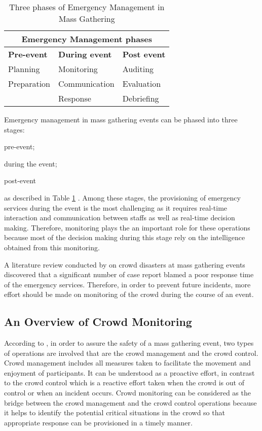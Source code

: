 \begin{table}[!htbp]
	\caption{Three phases of Emergency Management in Mass Gathering}
	\label{table:phaseOfEm}
	\centering
	\begin{tabular}{|p{3cm}|p{3cm}|p{3cm}|}
		\hline
		\multicolumn{3}{|c|}{\textbf{Emergency Management phases}} \\ \hline \hline
		\textbf{Pre-event} & \textbf{During event} & \textbf{Post event} \\	\hline
		Planning & Monitoring  & Auditing  \\
		Preparation & Communication & Evaluation \\
		& Response & Debriefing \\
		\hline
	\end{tabular}
\end{table}

Emergency management in mass gathering events can be phased into three stages: 
\begin{inparaenum}[i)]
	\item pre-event;
	\item during the event;
	\item post-event
\end{inparaenum} as described in Table \ref{table:phaseOfEm} \citep{DelirHaghighi2013}. Among these stages, the provisioning of emergency services during the event is the most challenging as it requires real-time interaction and communication between staffs as well as real-time decision making. Therefore, monitoring plays the an important role for these operations because most of the decision making during this stage rely on the intelligence obtained from this monitoring. 

A literature review conducted by \citet{Soomaroo2012} on crowd disasters at mass gathering events discovered that a significant number of case report blamed a poor response time of the emergency services. Therefore, in order to prevent future incidents, more effort should be made on monitoring of the crowd during the course of an event. 

\subsection{An Overview of Crowd Monitoring}

According to \citet{Berlonghi1995}, in order to assure the safety of a mass gathering event, two types of operations are involved that are the crowd management and the crowd control. Crowd management includes all measures taken to facilitate the movement and enjoyment of participants. It can be understood as a proactive effort, in contrast to the crowd control which is a reactive effort taken when the crowd is out of control or when an incident occurs. Crowd monitoring can be considered as the bridge between the crowd management and the crowd control operations because it helps to identify the potential critical situations in the crowd so that appropriate response can be provisioned in a timely manner.

